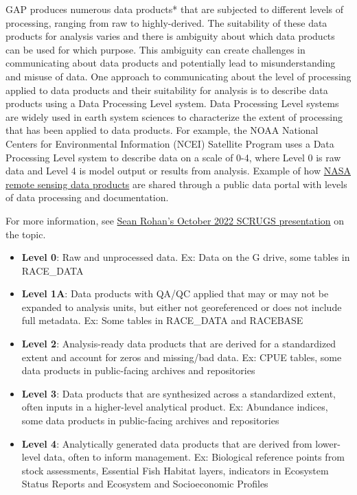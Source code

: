 \documentclass[
  letterpaper,
  oneside,
  open=any]{scrbook}
\providecommand{\tightlist}{%
  \setlength{\itemsep}{0pt}\setlength{\parskip}{0pt}}\usepackage{longtable,booktabs,array}
\begin{document}
GAP produces numerous data products* that are subjected to different
levels of processing, ranging from raw to highly-derived. The
suitability of these data products for analysis varies and there is
ambiguity about which data products can be used for which purpose. This
ambiguity can create challenges in communicating about data products and
potentially lead to misunderstanding and misuse of data. One approach to
communicating about the level of processing applied to data products and
their suitability for analysis is to describe data products using a Data
Processing Level system. Data Processing Level systems are widely used
in earth system sciences to characterize the extent of processing that
has been applied to data products. For example, the NOAA National
Centers for Environmental Information (NCEI) Satellite Program uses a
Data Processing Level system to describe data on a scale of 0-4, where
Level 0 is raw data and Level 4 is model output or results from
analysis. Example of how
\href{https://ladsweb.modaps.eosdis.nasa.gov/search/}{NASA remote
sensing data products} are shared through a public data portal with
levels of data processing and documentation.

For more information, see
\href{https://docs.google.com/presentation/d/1rWSZpeghWJqzWMIa5oBc4BCoy-zy1Yue86RoTw58u6M/edit?usp=sharing}{Sean
Rohan's October 2022 SCRUGS presentation} on the topic.

\begin{itemize}
\tightlist
\item
  \textbf{Level 0}: Raw and unprocessed data. Ex: Data on the G drive,
  some tables in RACE\_DATA
\item
  \textbf{Level 1A}: Data products with QA/QC applied that may or may
  not be expanded to analysis units, but either not georeferenced or
  does not include full metadata. Ex: Some tables in RACE\_DATA and
  RACEBASE
\item
  \textbf{Level 2}: Analysis-ready data products that are derived for a
  standardized extent and account for zeros and missing/bad data. Ex:
  CPUE tables, some data products in public-facing archives and
  repositories
\item
  \textbf{Level 3}: Data products that are synthesized across a
  standardized extent, often inputs in a higher-level analytical
  product. Ex: Abundance indices, some data products in public-facing
  archives and repositories
\item
  \textbf{Level 4}: Analytically generated data products that are
  derived from lower-level data, often to inform management. Ex:
  Biological reference points from stock assessments, Essential Fish
  Habitat layers, indicators in Ecosystem Status Reports and Ecosystem
  and Socioeconomic Profiles
\end{itemize}
\end{document}
